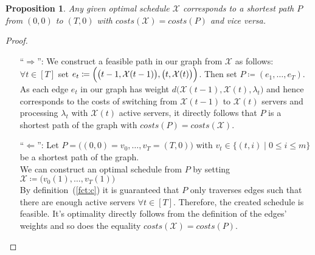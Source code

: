 \documentclass[hidelinks]{article}
\theoremstyle{plain}
\newtheorem{prop}[thm]{Proposition}
\theoremstyle{definition}
\theoremstyle{rem}
\newcommand{\mx}{\mathcal{X}}
\begin{document}
\begin{sloppypar}
\begin{prop}
	Any given optimal schedule $\mx$ corresponds to a shortest path $P$ from $(0,0)$ to $(T,0)$ with $costs(\mx)=costs(P)$ and vice versa.
\end{prop} 
\begin{proof}
$ $
\begin{itemize}
	\item[``$\Rightarrow$'':] We construct a feasible path in our graph from $\mx$ as follows:\\
$\forall t\in[T]$ set $e_t\coloneqq\Bigl(\bigl(t-1,\mx(t-1)\bigr),\bigl(t,\mx(t)\bigr)\Bigr)$. Then set $P\coloneqq(e_1,\ldots,e_{T})$.\\
	As each edge $e_t$ in our graph has weight $d\bigl(\mx(t-1),\mx(t),\lambda_{t}\bigr)$ and hence corresponds to the costs of switching from $\mx(t-1)$ to $\mx(t)$ servers and processing $\lambda_{t}$ with $\mx(t)$ active servers, it directly follows that $P$ is a shortest path of the graph with $costs(P)=costs(\mx)$.
	\item[``$\Leftarrow$'':] Let $P=\bigl((0,0)=v_0,\ldots,v_T=(T,0)\bigr)$ with $v_t\in\bigl\{(t,i)\mid 0\le i\le m\bigr\}$ be a shortest path of the graph.\\ 
	We can construct an optimal schedule from $P$ by setting $\mx\coloneqq\bigl(v_0(1),\ldots,v_T(1)\bigr)$\\
	By definition~(\ref{fct:c}) it is guaranteed that $P$ only traverses edges such that there are enough active servers $\forall t\in[T]$. Therefore, the created schedule is feasible. It's optimality directly follows from the definition of the edges' weights and so does the equality $costs(\mx)=costs(P)$.\\
\end{itemize}
\end{proof}


\end{sloppypar}
\end{document}
